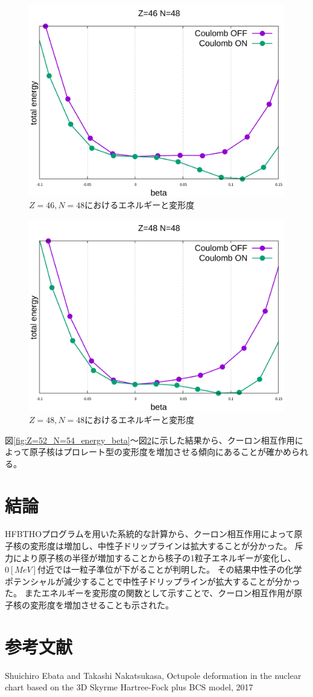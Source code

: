 \documentclass[12pt]{jarticle}
\begin{document}
\begin{figure}[h]
    \centering
    \includegraphics[width=120mm]{../Z=46_N=48_energy_beta.pdf}
    \caption{$Z=46,N=48$におけるエネルギーと変形度}\label{fig:Z=46_N=48_energy_beta}
\end{figure}
\begin{figure}[h]
    \centering
    \includegraphics[width=120mm]{../Z=48_N=48_energy_beta.pdf}
    \caption{$Z=48,N=48$におけるエネルギーと変形度}\label{fig:Z=48_N=48_energy_beta}
\end{figure}
図\ref{fig:Z=52_N=54_energy_beta}～図\ref{fig:Z=48_N=48_energy_beta}に示した結果から、クーロン相互作用によって原子核はプロレート型の変形度を増加させる傾向にあることが確かめられる。

\section{結論}
HFBTHOプログラムを用いた系統的な計算から、クーロン相互作用によって原子核の変形度は増加し、中性子ドリップラインは拡大することが分かった。
斥力により原子核の半径が増加することから核子の1粒子エネルギーが変化し、$0[MeV]$付近では一粒子準位が下がることが判明した。
その結果中性子の化学ポテンシャルが減少することで中性子ドリップラインが拡大することが分かった。
またエネルギーを変形度の関数として示すことで、クーロン相互作用が原子核の変形度を増加させることも示された。


\section{参考文献}
\begin{thebibliography}{99}
     Shuichiro Ebata and Takashi Nakatsukasa, Octupole deformation in the nuclear chart based on the 3D Skyrme Hartree-Fock plus BCS model, 2017
\end{thebibliography}
\end{document}
